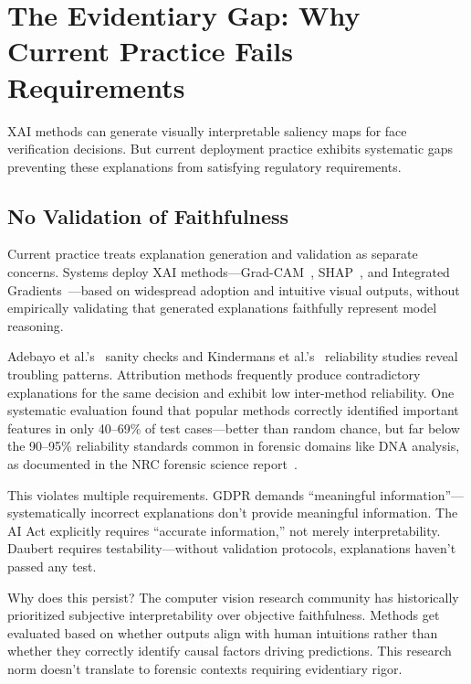 \section{The Evidentiary Gap: Why Current Practice Fails Requirements}

XAI methods can generate visually interpretable saliency maps for face verification decisions. But current deployment practice exhibits systematic gaps preventing these explanations from satisfying regulatory requirements.

\subsection{No Validation of Faithfulness}

Current practice treats explanation generation and validation as separate concerns. Systems deploy XAI methods—Grad-CAM~\cite{selvaraju2017gradcam}, SHAP~\cite{lundberg2017shap}, and Integrated Gradients~\cite{sundararajan2017ig}—based on widespread adoption and intuitive visual outputs, without empirically validating that generated explanations faithfully represent model reasoning.

Adebayo et al.'s~\cite{adebayo2018sanity} sanity checks and Kindermans et al.'s~\cite{kindermans2019reliability} reliability studies reveal troubling patterns. Attribution methods frequently produce contradictory explanations for the same decision and exhibit low inter-method reliability. One systematic evaluation found that popular methods correctly identified important features in only 40--69\% of test cases—better than random chance, but far below the 90--95\% reliability standards common in forensic domains like DNA analysis, as documented in the NRC forensic science report~\cite{nrc2009}.

This violates multiple requirements. GDPR demands ``meaningful information''—systematically incorrect explanations don't provide meaningful information. The AI Act explicitly requires ``accurate information,'' not merely interpretability. Daubert requires testability—without validation protocols, explanations haven't passed any test.

Why does this persist? The computer vision research community has historically prioritized subjective interpretability over objective faithfulness. Methods get evaluated based on whether outputs align with human intuitions rather than whether they correctly identify causal factors driving predictions. This research norm doesn't translate to forensic contexts requiring evidentiary rigor.

